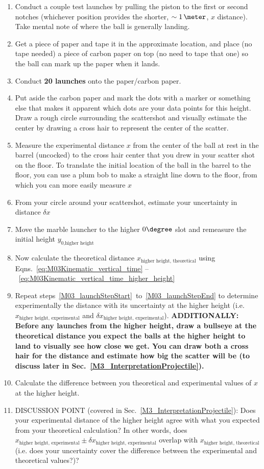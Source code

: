 \begin{enumerate}
\item \label{M03_launchStepStart} Conduct a couple test launches by pulling the piston to the first or second notches (whichever position provides the shorter, $\sim 1\,\meter$, $x$ distance). Take mental note of where the ball is generally landing.
\item Get a piece of paper and tape it in the approximate location, and place (no tape needed) a piece of carbon paper on top (no need to tape that one) so the ball can mark up the paper when it lands.
\item Conduct \textbf{20 launches} onto the paper/carbon paper.
\item Put aside the carbon paper and mark the dots with a marker or something else that makes it apparent which dots are your data points for this height. Draw a rough circle surrounding the scattershot and visually estimate the center by drawing a cross hair to represent the center of the scatter.
\item Measure the experimental distance $x$ from the center of the ball at rest in the barrel (uncocked) to the cross hair center that you drew in your scatter shot on the floor. To translate the initial location of the ball in the barrel to the floor, you can use a plum bob to make a straight line down to the floor, from which you can more easily measure $x$
\item \label{M03_launchStepEnd} From your circle around your scattershot, estimate your uncertainty in distance $\delta x$
\item Move the marble launcher to the higher $0 \degree$ slot and remeasure the initial height $y_{0\text{,higher height}}$
\item Now calculate the theoretical distance $x_{\text{higher height, theoretical}}$ using Eqns.~\ref{eq:M03Kinematic_vertical_time} -- ~\ref{eq:M03Kinematic_vertical_time_higher_height}
\item Repeat steps~\ref{M03_launchStepStart}~to~\ref{M03_launchStepEnd} to determine experimentally the distance with its uncertainty at the higher height (i.e. $x_{\text{higher height, experimental}}$ and $\delta x_{\text{higher height, experimental}}$). \textbf{ADDITIONALLY: Before any launches from the higher height, draw a bullseye at the theoretical distance you expect the balls at the higher height to land to visually see how close we get. You can draw both a cross hair for the distance and estimate how big the scatter will be (to discuss later in Sec.~\ref{M3_InterpretationProjectile}).}
\item Calculate the difference between you theoretical and experimental values of $x$ at the higher height.
\item DISCUSSION POINT (covered in Sec.~\ref{M3_InterpretationProjectile}): Does your experimental distance of the higher height agree with what you expected from your theoretical calculation? In other words, does $x_{\text{higher height, experimental}} \pm \delta x_{\text{higher height, experimental}}$ overlap with $x_{\text{higher height, theoretical}}$ (i.e. does your uncertainty cover the difference between the experimental and theoretical values?)?
\end{enumerate}
